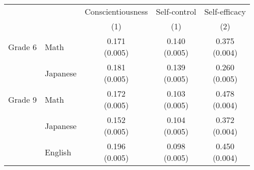 \begin{tabular}{llccc}
\hline \hline 
 &  & Conscientiousness & Self-control & Self-efficacy \\
 &  & (1) & (1) & (2) \\
\hline 
Grade 6 & Math & \makecell[tc]{0.171\\(0.005)} & \makecell[tc]{0.140\\(0.005)} & \makecell[tc]{0.375\\(0.004)} \\
 & Japanese & \makecell[tc]{0.181\\(0.005)} & \makecell[tc]{0.139\\(0.005)} & \makecell[tc]{0.260\\(0.005)} \\
Grade 9 & Math & \makecell[tc]{0.172\\(0.005)} & \makecell[tc]{0.103\\(0.005)} & \makecell[tc]{0.478\\(0.004)} \\
 & Japanese & \makecell[tc]{0.152\\(0.005)} & \makecell[tc]{0.104\\(0.005)} & \makecell[tc]{0.372\\(0.004)} \\
 & English & \makecell[tc]{0.196\\(0.005)} & \makecell[tc]{0.098\\(0.005)} & \makecell[tc]{0.450\\(0.004)} \\
\hline \hline 
\end{tabular}